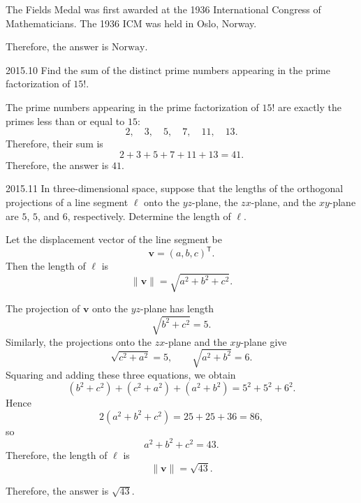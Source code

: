     \begin{solution}
        The Fields Medal was first awarded at the 1936 International Congress of Mathematicians. The
        1936 ICM was held in Oslo, Norway.

        Therefore, the answer is $\boxed{\text{Norway}}$.
    \end{solution}

    \begin{pastproblem}{2015.10}
        Find the sum of the distinct prime numbers appearing in the prime factorization of $15!$.
    \end{pastproblem}

    \begin{solution}
        The prime numbers appearing in the prime factorization of $15!$ are exactly the primes less
        than or equal to $15$:
        \[
            2,\quad 3,\quad 5,\quad 7,\quad 11,\quad 13.
        \]
        Therefore, their sum is
        \[
            2+3+5+7+11+13=41.
        \]
        Therefore, the answer is $\boxed{41}$.
    \end{solution}

    \begin{pastproblem}{2015.11}
        In three-dimensional space, suppose that the lengths of the orthogonal projections of a line
        segment $\ell$ onto the $yz$-plane, the $zx$-plane, and the $xy$-plane are $5$, $5$, and
        $6$, respectively. Determine the length of $\ell$.
    \end{pastproblem}

    \begin{solution}
        Let the displacement vector of the line segment be
        \[
            \mathbf{v}=(a,b,c)^{\mathsf T}.
        \]
        Then the length of $\ell$ is
        \[
            \|\mathbf{v}\|
            =
            \sqrt{a^2+b^2+c^2}.
        \]

        The projection of $\mathbf{v}$ onto the $yz$-plane has length
        \[
            \sqrt{b^2+c^2}=5.
        \]
        Similarly, the projections onto the $zx$-plane and the $xy$-plane give
        \[
            \sqrt{c^2+a^2}=5,
            \qquad
            \sqrt{a^2+b^2}=6.
        \]
        Squaring and adding these three equations, we obtain
        \[
            (b^2+c^2)+(c^2+a^2)+(a^2+b^2)
            =
            5^2+5^2+6^2.
        \]
        Hence
        \[
            2(a^2+b^2+c^2)=25+25+36=86,
        \]
        so
        \[
            a^2+b^2+c^2=43.
        \]
        Therefore, the length of $\ell$ is
        \[
            \|\mathbf{v}\|=\sqrt{43}.
        \]

        Therefore, the answer is $\boxed{\sqrt{43}}$.
    \end{solution}

